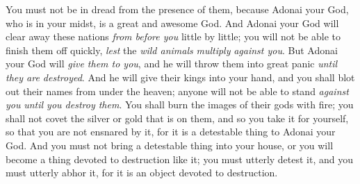 \begin{biblechapter}
\verse You must not be in dread from the presence of them, because Adonai your God, who is in your midst, is a great and awesome God.
\verse And Adonai your God will clear away these nations \textit{from before you} little by little; you will not be able to finish them off quickly, \textit{lest} the \textit{wild animals} \textit{multiply} \textit{against you}.
\verse But Adonai your God will \textit{give them to you}, and he will throw them into great panic \textit{until they are destroyed}.
\verse And he will give their kings into your hand, and you shall blot out their names from under the heaven; anyone will not be able to stand \textit{against you} \textit{until you destroy them}.
\verse You shall burn the images of their gods with fire; you shall not covet the silver or gold that is on them, and so you take it for yourself, so that you are not ensnared by it, for it is a detestable thing to Adonai your God.
\verse And you must not bring a detestable thing into your house, or you will become a thing devoted to destruction like it; you must utterly detest it, and you must utterly abhor it, for it is an object devoted to destruction.
\end{biblechapter}

